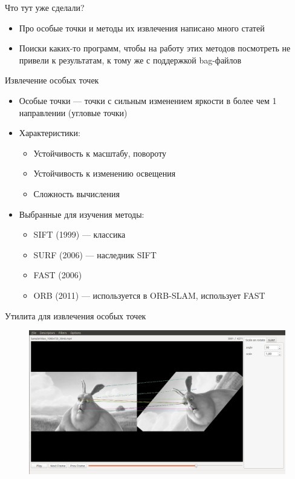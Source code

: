 \begin{frame}{Что тут уже сделали?}

\begin{itemize}
	\item Про особые точки и методы их извлечения написано много статей
	\item Поиски каких-то программ, чтобы на работу этих методов посмотреть не привели к результатам,
	к тому же с поддержкой bag-файлов
\end{itemize}

\end{frame}


\begin{frame}{Извлечение особых точек}
\begin{itemize}
	\item Особые точки --- точки с сильным изменением яркости в более чем 1 направлении (угловые точки)
	\item Характеристики:
	\begin{itemize}
		\item Устойчивость к масштабу, повороту
		\item Устойчивость к изменению освещения
		\item Сложность вычисления
	\end{itemize}
	\item Выбранные для изучения методы:
	\begin{itemize}
		\item SIFT (1999) --- классика
		\item SURF (2006) --- наследник SIFT
		\item FAST (2006)
		\item ORB (2011) --- используется в ORB-SLAM, использует FAST
	\end{itemize}
\end{itemize}
\end{frame}

\begin{frame}{Утилита для извлечения особых точек}
\begin{figure}
\centering
\includegraphics[scale=0.32]{data/Feature_match}
\end{figure}
\end{frame}

